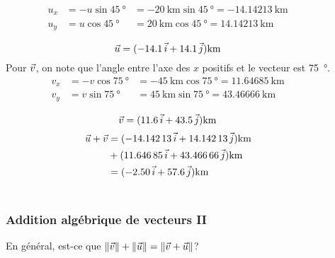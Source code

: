 \documentclass{beamer}
\begin{document}
\begin{frame}
{\begin{columns}
      \vspace{-0.4cm}
      \begin{eqnarray*}
        u_x &= -u \sin \SI{45}{\degree} &= -\SI{20}{\kilo\meter} \sin
          \SI{45}{\degree} = -\SI{14.14213}{\kilo\meter} \\
        u_y &=  u \cos \SI{45}{\degree} &=  \SI{20}{\kilo\meter} \cos
          \SI{45}{\degree} = \SI{14.14213}{\kilo\meter} \\
      \end{eqnarray*}
      \vspace{-1.2cm}
      \[
        \vec{u} = (-\num{14.1}\, \vec{i} + \num{14.1}\, \vec{j}) \si{\kilo\meter}
      \]
      Pour $\vec{v}$, on note que l'angle entre l'axe des $x$ positifs et
      le vecteur est \SI{75}{\degree}.
      \vspace{-0.4cm}
      \begin{eqnarray*}
        v_x &= -v \cos \SI{75}{\degree} &= -\SI{45}{\kilo\meter} \cos
          \SI{75}{\degree} = \SI{11.64685}{\kilo\meter} \\
        v_y &=  v \sin \SI{75}{\degree} &=  \SI{45}{\kilo\meter} \sin
          \SI{75}{\degree} = \SI{43.46666}{\kilo\meter} \\
      \end{eqnarray*}
      \vspace{-1.2cm}
      \[
        \vec{v} = (\num{11.6}\, \vec{i} + \num{43.5}\, \vec{j}) \si{\kilo\meter}
      \]
      \vspace{-1.0cm}
      \begin{align*}
        \vec{u} + \vec{v} &= (-\num{14.14213}\, \vec{i} + \num{14.14213}\, \vec{j}) \si{\kilo\meter} \\
                  &{}  +(\num{11.64685}\, \vec{i} + \num{43.46666}\, \vec{j})
                    \si{\kilo\meter} \\
                  &= (-\num{2.50}\, \vec{i} + \num{57.6}\, \vec{j}) \si{\kilo\meter}
      \end{align*}
    \end{columns}
  }
\end{frame}


\begin{frame}
  \frametitle{Addition algébrique de vecteurs II}

  En général, est-ce que $\lVert \vec{v} \rVert + \lVert \vec{u} \rVert = \lVert \vec{v} + \vec{u} \rVert$?

  \vspace{1cm}

\end{frame}
\end{document}
